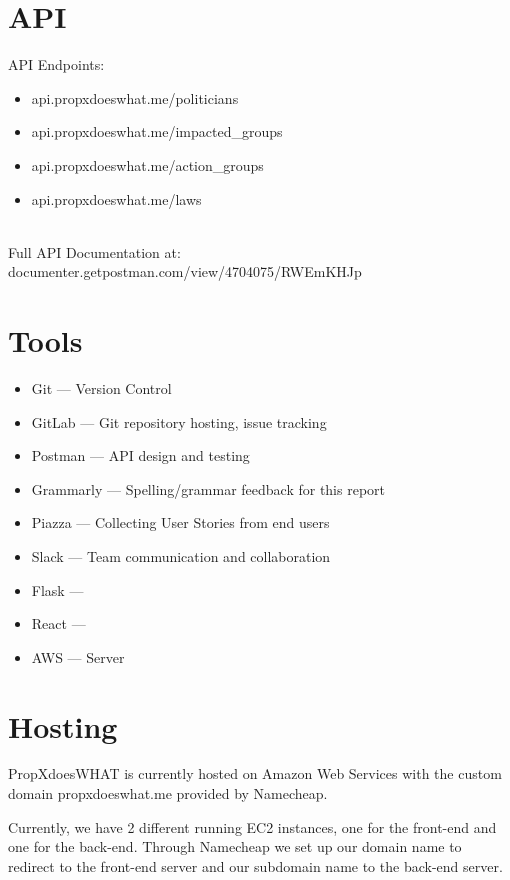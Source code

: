 \documentclass[12pt]{article}
\begin{document}
\section{API}

API Endpoints: \\

\begin{itemize}
	\item api.propxdoeswhat.me/politicians
	\item api.propxdoeswhat.me/impacted\_groups
	\item api.propxdoeswhat.me/action\_groups
	\item api.propxdoeswhat.me/laws
\end{itemize}

~\\
Full API Documentation at: documenter.getpostman.com/view/4704075/RWEmKHJp

\section{Tools}

\begin{itemize}
	\item Git		--- Version Control
	\item GitLab	--- Git repository hosting, issue tracking
	\item Postman	--- API design and testing %
	\item Grammarly	--- Spelling/grammar feedback for this report
	\item Piazza	--- Collecting User Stories from end users
	\item Slack		--- Team communication and collaboration
	\item Flask     --- 
	\item React     ---
	\item AWS       --- Server
\end{itemize}

\section{Hosting}

PropXdoesWHAT is currently hosted on Amazon Web Services with the custom domain propxdoeswhat.me provided by Namecheap.

Currently, we have 2 different running EC2 instances, one for the front-end and one for the back-end. Through Namecheap we set up our domain name to redirect to the front-end server and our subdomain name to the back-end server.
\end{document}
